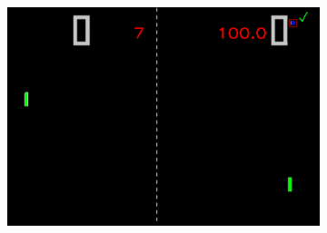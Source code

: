 \documentclass{report}
\begin{document}
\begin{figure}
\begin{subfigure}{\linewidth}
            \includegraphics[height=0.3\textheight]{loseAft.png}
        \end{subfigure}  
    \label{fig:cont}
\end{figure}
\end{document}

